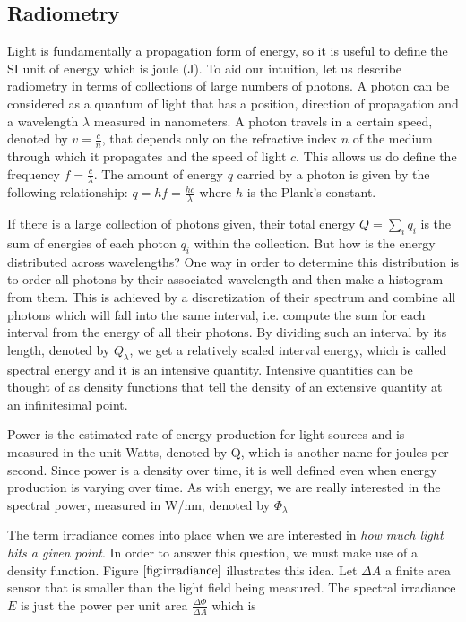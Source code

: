 \subsection{Radiometry}
Light is fundamentally a propagation form of energy, so it is useful to define the SI unit of energy which is joule (J). To aid our intuition, let us describe radiometry in terms of collections of large numbers of photons. A photon can be considered as a quantum of light that has a position, direction of propagation and a wavelength $\lambda$ measured in nanometers. A photon travels in a certain speed, denoted by $v = \frac{c}{n}$, that depends only on the refractive index $n$ of the medium through which it propagates and the speed of light $c$. This allows us do define the frequency $f = \frac{c}{\lambda}$. The amount of energy $q$ carried by a photon is given by the following relationship: $q = hf= \frac{hc}{\lambda}$ where $h$ is the Plank's constant.

If there is a large collection of photons given, their total energy $Q = \sum_i q_i$ is the sum of energies of each photon $q_i$ within the collection. But how is the energy distributed across wavelengths? One way in order to determine this distribution is to order all photons by their associated wavelength and then make a histogram from them. This is achieved by a discretization of their spectrum and combine all photons which will fall into the same interval, i.e. compute the sum for each interval from the energy of all their photons. By dividing such an interval by its length, denoted by $Q_\lambda$, we get a relatively scaled interval energy, which is called spectral energy and it is an intensive quantity. Intensive quantities can be thought of as density functions that tell the density of an extensive quantity at an infinitesimal point.

Power is the estimated rate of energy production for light sources and is measured in the unit Watts, denoted by Q, which is another name for joules per second. Since power is a density over time, it is well defined even when energy production is varying over time. As with energy, we are really interested in the spectral power, measured in W/nm, denoted by $\Phi_\lambda$

The term irradiance comes into place when we are interested in \textit{how much light hits a given point}. In order to answer this question, we must make use of a density function. Figure $\ref{fig:irradiance}$ illustrates this idea. Let $\Delta A$ a finite area sensor that is smaller than the light field being measured. The spectral irradiance $E$ is just the power per unit area $\frac{\Delta \Phi}{\Delta A}$ which is 

